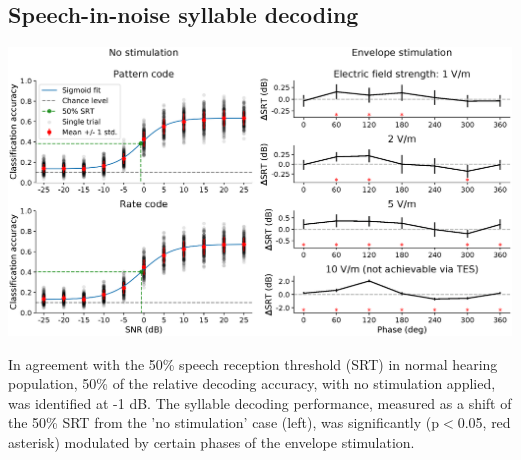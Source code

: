 \documentclass[a0,portrait]{a0poster}
\newenvironment{nitemize}{%
  \begin{itemize}[topsep=6pt,itemsep=2pt,parsep=0pt]%
}{%
  \end{itemize}%
}
\newenvironment{Figure}
  {\par\medskip\noindent\minipage{\linewidth}}
  {\endminipage\par\medskip}
\begin{document}
\begin{multicols*}{2}
\subsection*{Speech-in-noise syllable decoding}
\begin{Figure}
\centering
\includegraphics[width=\linewidth,keepaspectratio]{Stimulation.eps}
\end{Figure}
\begin{flushleft}
\normalsize
In agreement with the 50\% speech reception threshold (SRT) in normal hearing population, 50\% of the relative decoding accuracy, with no stimulation applied, was identified at -1 dB. The syllable decoding performance, measured as a shift of the 50\% SRT from the 'no stimulation' case (left), was significantly (p$<$0.05, red asterisk) modulated by certain phases of the envelope stimulation.
\end{flushleft}






\end{multicols*}
\end{document}
